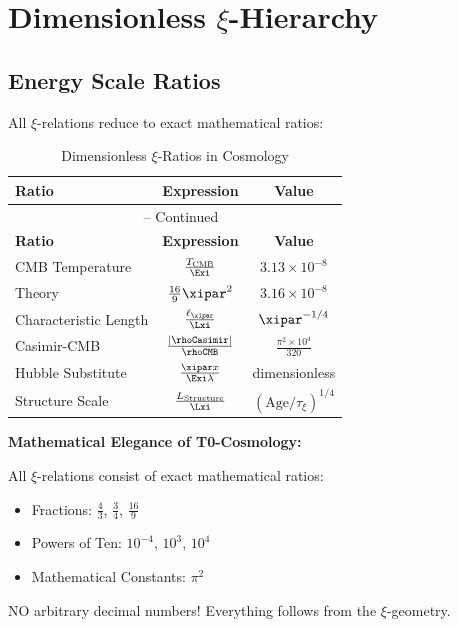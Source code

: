 	\section{Dimensionless $\xi$-Hierarchy}
	
	\subsection{Energy Scale Ratios}
	
	All $\xi$-relations reduce to exact mathematical ratios:
	
	\begin{longtable}{lcc}
		\caption{Dimensionless $\xi$-Ratios in Cosmology} \\
		\toprule
		\textbf{Ratio} & \textbf{Expression} & \textbf{Value} \\
		\midrule
		\endfirsthead
		\multicolumn{3}{c}{\tablename\ \thetable{} -- Continued} \\
		\toprule
		\textbf{Ratio} & \textbf{Expression} & \textbf{Value} \\
		\midrule
		\endhead
		CMB Temperature & $\frac{T_{\text{CMB}}}{\Exi}$ & $3.13 \times 10^{-8}$ \\
		Theory & $\frac{16}{9}\xipar^2$ & $3.16 \times 10^{-8}$ \\
		Characteristic Length & $\frac{\ell_{\xipar}}{\Lxi}$ & $\xipar^{-1/4}$ \\
		Casimir-CMB & $\frac{|\rhoCasimir|}{\rhoCMB}$ & $\frac{\pi^2 \times 10^4}{320}$ \\
		Hubble Substitute & $\frac{\xipar x}{\Exi \lambda}$ & dimensionless \\
		Structure Scale & $\frac{L_{\text{Structure}}}{\Lxi}$ & $(\text{Age}/\tau_\xi)^{1/4}$ \\
		\bottomrule
	\end{longtable}
\normalsize
	
	\begin{warning}
		\textbf{Mathematical Elegance of T0-Cosmology:}
		
		All $\xi$-relations consist of exact mathematical ratios:
		\begin{itemize}
			\item Fractions: $\frac{4}{3}$, $\frac{3}{4}$, $\frac{16}{9}$
			\item Powers of Ten: $10^{-4}$, $10^3$, $10^4$
			\item Mathematical Constants: $\pi^2$
		\end{itemize}
		
		NO arbitrary decimal numbers! Everything follows from the $\xi$-geometry.
	\end{warning}
	
